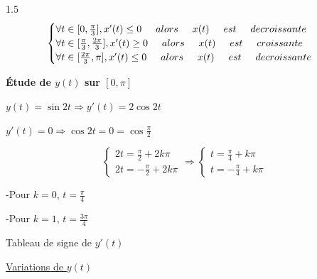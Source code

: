 \documentclass[12pt]{article}
\begin{document}
\begin{spacing}{1.5}
\[
\begin{cases}
\forall t\in [0,\frac{\pi}{3}],x'(t)\leq 0\hspace*{0.5cm} alors\hspace*{0.5cm} x(t)\hspace*{0.5cm} est \hspace*{0.5cm}decroissante\\
\forall t\in [\frac{\pi}{3}, \frac{2\pi}{3}], x'(t)\geq 0 \hspace*{0.5cm} alors\hspace*{0.5cm} x(t)\hspace*{0.5cm} est\hspace*{0.5cm} croissante\\
\forall t\in [\frac{2\pi}{3},\pi], x'(t)\leq 0\hspace*{0.5cm} alors\hspace*{0.5cm} x(t)\hspace*{0.5cm} est\hspace*{0.5cm} decroissante
\end{cases}
\]

\medskip\textbf{Étude de $y(t)$ sur $[0,\pi]$}

$y(t)=\sin{2t}\Rightarrow y'(t)=2\cos 2t$

$y'(t)=0\Rightarrow \cos 2t=0=\cos\frac{\pi}{2}$

\[
\begin{cases}
2t=\frac{\pi}{2}+2k\pi\\
2t=-\frac{\pi}{2}+2k\pi
\end{cases}\Rightarrow
\begin{cases}
t=\frac{\pi}{4}+k\pi\\
t=-\frac{\pi}{4}+k\pi
\end{cases}
\]

-Pour $k=0$, $t=\frac{\pi}{4}$

-Pour $k=1$, $t=\frac{3\pi}{4}$

Tableau de signe de $y'(t)$


\underline{Variations de $y(t)$}


\end{spacing}
\end{document}
